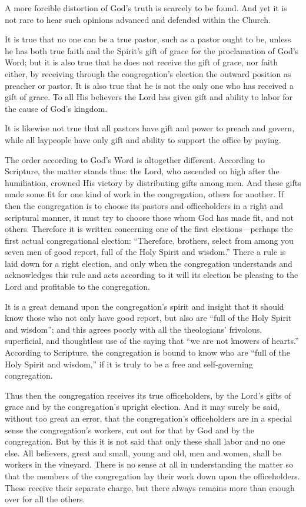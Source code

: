 A more forcible distortion of God’s truth is scarcely to be found. And yet it is not rare to hear such opinions advanced and defended within the Church.

It is true that no one can be a true pastor, such as a pastor ought to be, unless he has both true faith and the Spirit’s gift of grace for the proclamation of God’s Word; but it is also true that he does not receive the gift of grace, nor faith either, by receiving through the congregation’s election the outward position as preacher or pastor. It is also true that he is not the only one who has received a gift of grace. To all His believers the Lord has given gift and ability to labor for the cause of God’s kingdom.

It is likewise not true that all pastors have gift and power to preach and govern, while all laypeople have only gift and ability to support the office by paying.

The order according to God’s Word is altogether different. According to Scripture, the matter stands thus: the Lord, who ascended on high after the humiliation, crowned His victory by distributing gifts among men. And these gifts made some fit for one kind of work in the congregation, others for another. If then the congregation is to choose its pastors and officeholders in a right and scriptural manner, it must try to choose those whom God has made fit, and not others. Therefore it is written concerning one of the first elections—perhaps the first actual congregational election: “Therefore, brothers, select from among you seven men of good report, full of the Holy Spirit and wisdom.” There a rule is laid down for a right election, and only when the congregation understands and acknowledges this rule and acts according to it will its election be pleasing to the Lord and profitable to the congregation.

It is a great demand upon the congregation’s spirit and insight that it should know those who not only have good report, but also are “full of the Holy Spirit and wisdom”; and this agrees poorly with all the theologians’ frivolous, superficial, and thoughtless use of the saying that “we are not knowers of hearts.” According to Scripture, the congregation is bound to know who are “full of the Holy Spirit and wisdom,” if it is truly to be a free and self-governing congregation.

Thus then the congregation receives its true officeholders, by the Lord’s gifts of grace and by the congregation’s upright election. And it may surely be said, without too great an error, that the congregation’s officeholders are in a special sense the congregation’s workers, cut out for that by God and by the congregation. But by this it is not said that only these shall labor and no one else. All believers, great and small, young and old, men and women, shall be workers in the vineyard. There is no sense at all in understanding the matter so that the members of the congregation lay their work down upon the officeholders. These receive their separate charge, but there always remains more than enough over for all the others.

